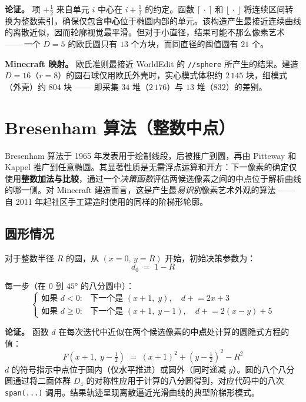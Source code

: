 \documentclass[12pt,a4paper]{scrartcl}
\newcommand{\code}[1]{\texttt{\small #1}}
\newcommand{\acc}[1]{\textcolor{accent}{\textbf{#1}}}
\newcommand{\cmd}[1]{\textcolor{earth}{\texttt{\small #1}}}
\begin{document}
\textbf{论证。} 项 $+\tfrac{1}{2}$ 来自单元 $i$ 中心在 $i+\tfrac{1}{2}$ 的约定。函数 $\lceil\,\cdot\,\rceil$ 和 $\lfloor\,\cdot\,\rfloor$ 将连续区间转换为整数索引，确保仅包含\acc{中心}位于椭圆内部的单元。该构造产生最接近连续曲线的离散近似，因而轮廓视觉最平滑。但对于小直径，结果可能不那么像素艺术 —— 一个 $D=5$ 的欧氏圆只有 $13$ 个方块，而同直径的阈值圆有 $21$ 个。

\begin{minec}
\textbf{Minecraft 映射。} 欧氏准则最接近 WorldEdit 的 \cmd{//sphere} 所产生的结果。建造 $D=16$（$r=8$）的圆石球仅用欧氏外壳时，实心模式体积约 $2\,145$ 块，细模式（外壳）约 $804$ 块 —— 即采集 $34$ 堆（$2\,176$）与 $13$ 堆（$832$）的差别。
\end{minec}

\section{Bresenham 算法（整数中点）}

Bresenham 算法于 1965 年发表用于绘制线段，后被推广到圆，再由 Pitteway 和 Kappel 推广到任意椭圆。其显著性质是无需浮点运算和开方：下一像素的确定仅使用\acc{整数加法与比较}，通过一个\emph{决策函数}评估两候选像素之间的中点位于解析曲线的哪一侧。对 Minecraft 建造而言，这是产生最\emph{易识别}像素艺术外观的算法 —— 自 2011 年起社区手工建造时使用的同样的阶梯形轮廓。

\subsection{圆形情况}

对于整数半径 $R$ 的圆，从 $(x{=}0,\,y{=}R)$ 开始，初始决策参数为：
\[
d_0 \;=\; 1 - R
\]

每一步（在 $0$ 到 $45°$ 的八分圆中）：
\[
\begin{cases}
\text{如果 } d < 0: & \text{下一个是 } (x{+}1,\;y), \quad d \mathrel{+}= 2x+3 \\[2pt]
\text{如果 } d \geq 0: & \text{下一个是 } (x{+}1,\;y{-}1), \quad d \mathrel{+}= 2(x-y)+5
\end{cases}
\]

\textbf{论证。} 函数 $d$ 在每次迭代中近似在两个候选像素的\acc{中点}处计算的圆隐式方程的值：
\[
F\!\left(x+1,\;y-\tfrac{1}{2}\right) \;=\; (x+1)^2 + \left(y-\tfrac{1}{2}\right)^{\!2} - R^2
\]
$d$ 的符号指示中点位于圆内（仅水平推进）或圆外（同时递减 $y$）。圆的八个八分圆通过将二面体群 $D_4$ 的对称性应用于计算的八分圆得到，对应代码中的八次 \code{span(...)} 调用。结果轨迹呈现离散逼近光滑曲线的典型阶梯形模式。
\end{document}
